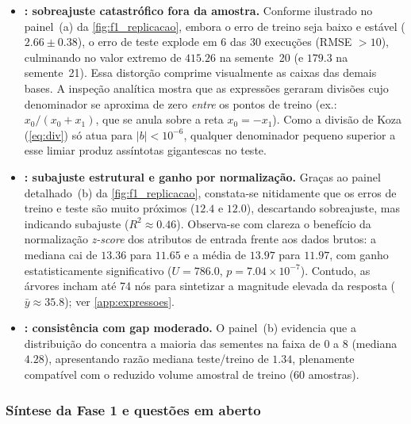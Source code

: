 \begin{itemize}
  \item \textbf{: sobreajuste catastrófico fora da amostra.}
        Conforme ilustrado no painel~(a) da \cref{fig:f1_replicacao}, embora o
        erro de treino seja baixo e estável ($2.66\pm0.38$), o erro de teste
        explode em 6 das 30 execuções (RMSE $>10$), culminando no valor extremo
        de $415.26$ na semente~20 (e $179.3$ na semente~21). Essa distorção
        comprime visualmente as caixas das demais bases. A inspeção analítica
        mostra que as expressões geraram divisões cujo denominador se aproxima
        de zero \emph{entre} os pontos de treino (ex.: $x_0/(x_0+x_1)$, que se
        anula sobre a reta $x_0 = -x_1$). Como a divisão de Koza (\cref{eq:div})
        só atua para $|b| < 10^{-6}$, qualquer denominador pequeno superior a
        esse limiar produz assíntotas gigantescas no teste.
  \item \textbf{: subajuste estrutural e ganho por normalização.}
        Graças ao painel detalhado~(b) da \cref{fig:f1_replicacao}, constata-se
        nitidamente que os erros de treino e teste são muito próximos ($12.4$ e
        $12.0$), descartando sobreajuste, mas indicando subajuste
        ($R^2 \approx 0.46$). Observa-se com clareza o benefício da
        normalização \emph{z-score} dos atributos de entrada frente aos dados
        brutos: a mediana cai de $13.36$ para $11.65$ e a média de $13.97$
        para $11.97$, com ganho estatisticamente significativo
        ($U = 786.0$, $p = 7.04\times10^{-7}$). Contudo, as árvores incham até
        74 nós para sintetizar a magnitude elevada da resposta ($\bar{y} \approx 35.8$); ver
        \cref{app:expressoes}.
  \item \textbf{: consistência com gap moderado.} O painel~(b)
        evidencia que a distribuição do  concentra a maioria das
        sementes na faixa de 0 a 8 (mediana $4.28$), apresentando razão
        mediana teste/treino de $1.34$, plenamente compatível com o reduzido
        volume amostral de treino (60 amostras).
\end{itemize}

\subsubsection{Síntese da Fase 1 e questões em aberto}
\label{sec:f1_sintese}

